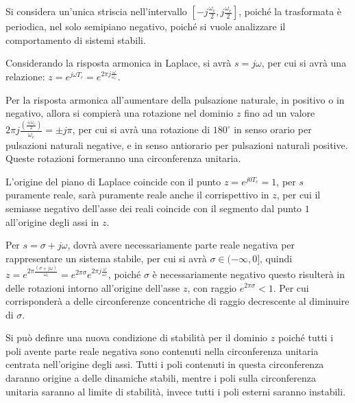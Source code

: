 \documentclass{article}
\numberwithin{equation}{subsection}
\begin{document}
Si considera un'unica striscia nell'intervallo $\left[\displaystyle-j\frac{\omega_c}{2},j\frac{\omega_c}{2}\right]$, poiché la trasformata è periodica, nel solo semipiano 
negativo, poiché si vuole analizzare il comportamento di sistemi stabili. 

Considerando la risposta armonica in Laplace, si avrà $s=j\omega$, per cui si avrà una relazione: $z=e^{j\omega T_c}=e^{2\pi j\frac{\omega}{\omega_c}}$. 

Per la risposta armonica all'aumentare della pulsazione naturale, in positivo o in negativo, 
allora si compierà una rotazione nel dominio $z$ fino ad un valore $2\pi j\displaystyle\frac{\left(\frac{\pm\omega_c}{2}\right)}{\omega_c}=\pm j\pi$, per cui si avrà una rotazione di 
$180^{\circ}$ in senso orario per pulsazioni naturali negative, e in senso antiorario per pulsazioni naturali positive. Queste rotazioni formeranno una circonferenza 
unitaria. 

L'origine del piano di Laplace coincide con il punto $z=e^{j0T_c}=1$, per $s$ puramente reale, sarà puramente reale anche il corrispettivo in $z$, per cui il semiasse 
negativo dell'asse dei reali coincide con il segmento dal punto $1$ all'origine degli assi in $z$. 

Per $s=\sigma+j\omega$, dovrà avere necessariamente parte reale negativa per rappresentare un sistema stabile, per cui si avrà $\sigma\in(-\infty,0]$, quindi 
$z=e^{2\pi\frac{(\sigma+j\omega)}{\omega_c}}=e^{2\pi\sigma}e^{2\pi j\frac{\omega}{\omega_c}}$, poiché $\sigma$ è necessariamente negativo questo risulterà in 
delle rotazioni intorno all'origine dell'asse $z$, con raggio $e^{2\pi\sigma}<1$. Per cui corrisponderà a delle circonferenze concentriche di raggio decrescente al 
diminuire di $\sigma$. 

Si può definre una nuova condizione di stabilità per il dominio $z$ poiché tutti i poli avente parte reale negativa sono contenuti nella circonferenza 
unitaria centrata nell'origine degli assi. Tutti i poli contenuti in questa circonferenza daranno origine a delle dinamiche stabili, mentre i poli sulla circonferenza unitaria 
saranno al limite di stabilità, invece tutti i poli esterni saranno instabili. 
\end{document}

